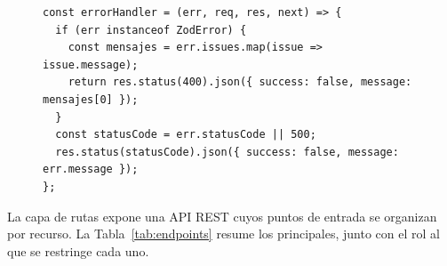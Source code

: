 \documentclass[11pt,oneside,spanish,listoffigures,listoftables]{tfgetsinf}
\begin{document}
\begin{figure}[htbp]
\begin{lstlisting}[caption={Gestor de errores centralizado que distingue los fallos de validación de \textit{Zod} del resto.}, label={lst:errorhandler}]
const errorHandler = (err, req, res, next) => {
  if (err instanceof ZodError) {
    const mensajes = err.issues.map(issue => issue.message);
    return res.status(400).json({ success: false, message: mensajes[0] });
  }
  const statusCode = err.statusCode || 500;
  res.status(statusCode).json({ success: false, message: err.message });
};
\end{lstlisting}
\end{figure}

La capa de rutas expone una API REST cuyos puntos de entrada se organizan por recurso. La Tabla~\ref{tab:endpoints} resume los principales, junto con el rol al que se restringe cada uno.
\end{document}
